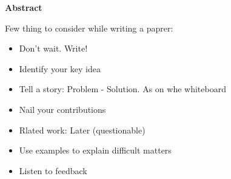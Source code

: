 
\clearemptydoublepage
{}
{}	

\vspace*{2cm}
\begin{center}
{\Large \textbf{Abstract}}
\end{center}
\vspace{1cm}

Few thing to consider while writing a paprer:
\begin{itemize}
    \item {Don't wait. Write!}
    \item {Identify your key idea}
    \item {Tell a story: Problem - Solution. As on whe whiteboard}
    \item {Nail your contributions}
    \item {Rlated work: Later (questionable)}
    \item {Use examples to explain difficult matters}
    \item {Listen to feedback}
\end{itemize}